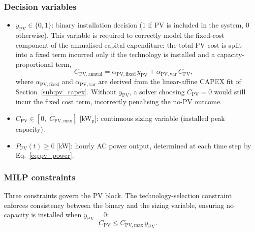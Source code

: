 \documentclass[11pt,a4paper]{report}
\begin{document}
\subsubsection{Decision variables}
\label{sub:pv_vars}

\begin{itemize}

    \item $y_\mathrm{PV} \in \{0,1\}$: binary installation decision (1 if PV is
          included in the system, 0 otherwise).
          This variable is required to correctly model the fixed-cost component of the
          annualised capital expenditure: the total PV cost is split into a fixed term
          incurred only if the technology is installed and a capacity-proportional term,
          \begin{equation}
              C_\mathrm{PV,annual} = \alpha_\mathrm{PV,fixed}\,y_\mathrm{PV}
                                   + \alpha_\mathrm{PV,var}\,C_\mathrm{PV},
              \label{eq:pv_capex_lin}
          \end{equation}
          where $\alpha_\mathrm{PV,fixed}$ and $\alpha_\mathrm{PV,var}$ are derived
          from the linear-affine CAPEX fit of Section~\ref{sub:pv_capex}.
          Without $y_\mathrm{PV}$, a solver choosing $C_\mathrm{PV}=0$ would still
          incur the fixed cost term, incorrectly penalising the no-PV outcome.

    \item $C_\mathrm{PV} \in [0,\; C_\mathrm{PV,max}]$ [kW$_\mathrm{p}$]:
          continuous sizing variable (installed peak capacity).

    \item $P_\mathrm{PV}(t) \geq 0$ [kW]: hourly AC power output, determined at each
          time step by Eq.~\eqref{eq:pv_power}.

\end{itemize}

\subsubsection{MILP constraints}
\label{sub:pv_constraints}

Three constraints govern the PV block.
The technology-selection constraint enforces consistency between the binary and the
sizing variable, ensuring no capacity is installed when $y_\mathrm{PV}=0$:
\begin{equation}
    C_\mathrm{PV} \leq C_\mathrm{PV,max}\, y_\mathrm{PV}.
    \label{eq:pv_select}
\end{equation}
\end{document}
